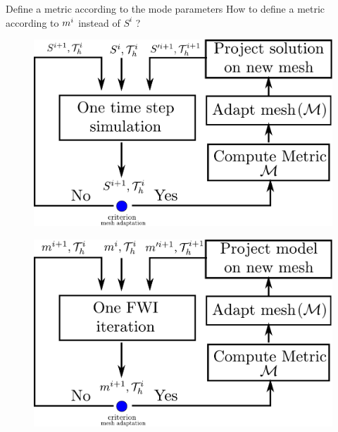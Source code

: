 \begin{frame}{Define a metric according to the mode parameters}
  How to define a metric according to ${m}^i$ instead of $S^i$ ?
  \vspace{0.5cm}
  \begin{multicols}{2}
    \vspace{-1cm}
    \begin{figure}
      \includegraphics[scale=0.27]{image/mesh_adapt_workflow.pdf}
    \end{figure}
    \columnbreak
        \begin{figure}
      \includegraphics[scale=0.27]{image/mesh_adapt_workflow_fwi.pdf}
    \end{figure}
     \end{multicols}
\end{frame}


